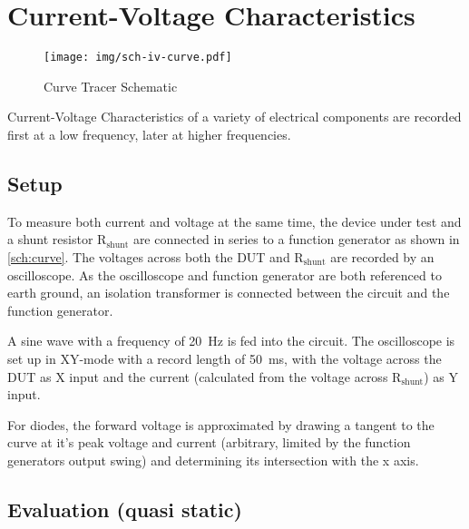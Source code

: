 \chapter{Current-Voltage Characteristics}

\begin{figure}[tbp]
	\centering
	\texttt{[image: img/sch-iv-curve.pdf]}
	\caption{Curve Tracer Schematic}
	\label{sch:curve}
\end{figure}

Current-Voltage Characteristics of a variety of electrical components are recorded first at a low frequency, later at higher frequencies.

\section{Setup}

To measure both current and voltage at the same time, the device under test and a shunt resistor $\mathrm{R_{shunt}}$ are connected in series to a function generator as shown in \autoref{sch:curve}.
The voltages across both the DUT and $\mathrm{R_{shunt}}$ are recorded by an oscilloscope.
As the oscilloscope and function generator are both referenced to earth ground, an isolation transformer is connected between the circuit and the function generator.

A sine wave with a frequency of \SI{20}{\hertz} is fed into the circuit.
The oscilloscope is set up in XY-mode with a record length of \SI{50}{\ms}, with the voltage across the DUT as X input and the current (calculated from the voltage across $\mathrm{R_{shunt}}$) as Y input.

For diodes, the forward voltage is approximated by drawing a tangent to the curve at it's peak voltage and current (arbitrary, limited by the function generators output swing) and determining its intersection with the x axis.

\section{Evaluation (quasi static)}

\def\ivsubfigwidth{0.45\textwidth}
\def\ivgraphicswidth{1.1\textwidth}

